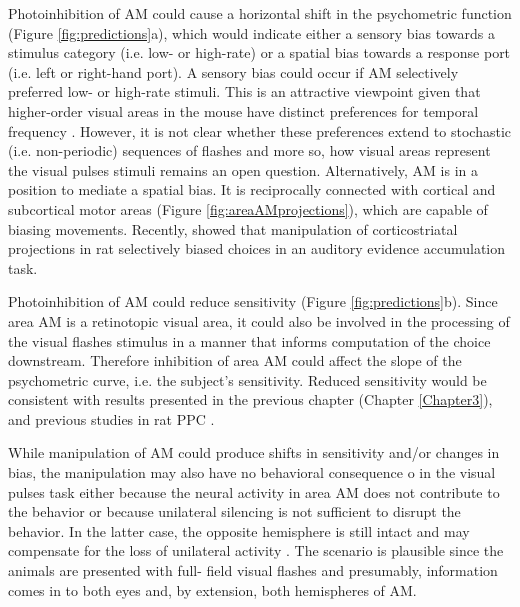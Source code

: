 Photoinhibition of AM could cause a horizontal shift in the psychometric function (Figure \ref{fig:predictions}a), which would indicate either a sensory bias towards a stimulus category (i.e. low- or high-rate) or a spatial bias towards a response port (i.e. left or right-hand port). A sensory bias could occur if AM selectively preferred low- or high-rate stimuli. This is an attractive viewpoint given that higher-order visual areas in the mouse have distinct preferences for temporal frequency \parencite{Andermann2011,Marshel2011,Tohmi2014}. However, it is not clear whether these preferences extend to stochastic (i.e. non-periodic) sequences of flashes and more so, how visual areas represent the visual pulses stimuli remains an open question. Alternatively, AM is in a position to mediate a spatial bias. It is reciprocally connected with cortical \parencite{Wang2012} and subcortical motor areas \parencite{AllenBrain2015} (Figure \ref{fig:areaAMprojections}), which are capable of biasing movements. Recently, \textcite{Znamenskiy2013b} showed that manipulation of corticostriatal projections in rat selectively biased choices in an auditory evidence accumulation task. 

Photoinhibition of AM could reduce sensitivity (Figure \ref{fig:predictions}b). Since area AM is a retinotopic visual area, it could also be involved in the processing of the visual flashes stimulus in a manner that informs computation of the choice downstream. Therefore inhibition of area AM could affect the slope of the psychometric curve, i.e. the subject's sensitivity. Reduced sensitivity would be consistent with results presented in the previous chapter (Chapter \ref{Chapter3}), and previous studies in rat PPC \parencite{Raposo2014,Licata2017}. 

While manipulation of AM could produce shifts in sensitivity and/or changes in bias, the manipulation may also have no behavioral consequence o
in the visual pulses task either because the neural activity in area AM does not contribute to the behavior or because unilateral silencing is not sufficient to disrupt the behavior. In the latter case, the opposite hemisphere is still intact and may compensate for the loss of unilateral activity \parencite{Li2016}. The scenario is plausible since the animals are presented with full- field visual flashes and presumably, information comes in to both eyes and, by extension, both hemispheres of AM.

